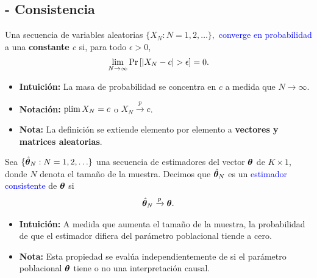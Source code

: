 \documentclass[10pt, xcolor=dvipsnames]{beamer}
\begin{document}
\subsection{- Consistencia}

\begin{frame}[plain]
\begin{tcolorbox}[colback=white, arc=0mm,boxrule=0.5pt, title=Definición: Convergencia en probabilidad (débil), breakable]	
    Una secuencia de variables aleatorias $\{X_N: N=1, 2, \ldots\},$ \textcolor{blue}{converge en probabilidad} a una \textbf{constante $c$} si, para todo $\epsilon>0$,
    \begin{align*}	
        \lim_{N \rightarrow \infty} \Prob{|X_N-c|>\epsilon}=0.
    \end{align*}
\end{tcolorbox}
\begin{itemize}    
    \item \textbf{Intuición:} La masa de probabilidad se concentra en $c$ a medida que $N \to \infty$.
    \item \textbf{Notación:} $\plim X_N = c$ o $X_N \xrightarrow{p} c$. %
    \item \textbf{Nota:} La definición se extiende elemento por elemento a \textbf{vectores y matrices aleatorias}. 
\end{itemize}
\end{frame}


\begin{frame}[plain]
\begin{tcolorbox}[colback=white, arc=0mm,boxrule=0.5pt, title=Definición: Consistencia de un estimador, breakable]
    Sea $\{\hat{\boldsymbol{\theta}}_N:N=1,2,\ldots\}$ una secuencia de estimadores del vector $\boldsymbol{\theta}$ de $K\times 1$, donde $N$ denota el tamaño de la muestra. Decimos que $\hat{\boldsymbol{\theta}}_N$ es un \textcolor{blue}{estimador consistente} de $\boldsymbol{\theta}$ si
    \begin{align*}
        \hat{\boldsymbol{\theta}}_N \xrightarrow{p} \boldsymbol{\theta}.
    \end{align*}
\end{tcolorbox}
\begin{itemize}
    \item \textbf{Intuición:} A medida que aumenta el tamaño de la muestra, la probabilidad de que el estimador difiera del parámetro poblacional tiende a cero.
    \item \textbf{Nota:} Esta propiedad se evalúa independientemente de si el parámetro poblacional \(\boldsymbol{\theta}\) tiene o no una interpretación causal.
\end{itemize}
\end{frame}
\end{document}
